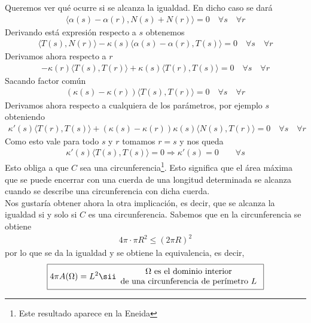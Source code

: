\begin{observacion}
\begin{enumerate}[start=4]
        Queremos ver qué ocurre si se alcanza la igualdad. En dicho caso se dará
        \begin{gather*}
            \langle \alpha(s)-\alpha(r), N(s)+N(r)\rangle = 0 \quad \forall s \quad \forall r
        \end{gather*}
        Derivando está expresión respecto a $s$ obtenemos
        \begin{gather*}
            \langle T(s) , N(r) \rangle - \kappa(s)\langle \alpha(s)-\alpha(r), T(s) \rangle = 0 \quad \forall s \quad \forall r
        \end{gather*}
        Derivamos ahora respecto a $r$
        \begin{gather*}
            -\kappa(r)\langle T(s), T(r)\rangle + \kappa(s) \langle T(r), T(s) \rangle = 0 \quad \forall s \quad \forall r
        \end{gather*}
        Sacando factor común
        \begin{gather*}
            (\kappa(s) - \kappa(r))\langle T(s), T(r) \rangle = 0 \quad \forall s \quad \forall r
        \end{gather*}
        Derivamos ahora respecto a cualquiera de los parámetros, por ejemplo $s$ obteniendo
        \begin{gather*}
            \kappa'(s)\langle T(r), T(s) \rangle + (\kappa(s)- \kappa(r)) \kappa(s)\langle N(s), T(r) \rangle = 0 \quad \forall s \quad \forall r
        \end{gather*}
        Como esto vale para todo $s$ y $r$ tomamos $r=s$ y nos queda
        \begin{gather*}
            \kappa'(s) \langle T(s), T(s) \rangle = 0 \Rightarrow \kappa'(s)=0 \qquad \forall s
        \end{gather*}
        Esto obliga a que $C$ sea una circunferencia\footnote{Este resultado aparece en la Eneida}. Esto significa que el área máxima que se puede encerrar con una cuerda de una longitud determinada se alcanza cuando se describe una circunferencia con dicha cuerda.\\

        Nos gustaría obtener ahora la otra implicación, es decir, que se alcanza la igualdad si y solo si $C$ es una circunferencia. Sabemos que en la circunferencia se obtiene
        \begin{gather*}
            4\pi \cdot \pi R^2 \leq (2\pi R)^2
        \end{gather*}
        por lo que se da la igualdad y se obtiene la equivalencia, es decir,
        \begin{gather*}
            \boxed{4\pi A(\Omega) = L^2 \sii 
            \begin{array}{c}
                \Omega \text{ es el dominio interior}\\
                \text{de una circunferencia de perímetro $L$}
            \end{array}
            }
        \end{gather*}


\end{enumerate}
\end{observacion}

